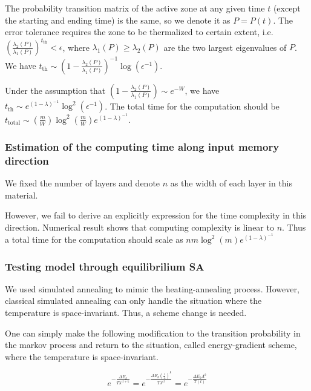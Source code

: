 \documentclass[twocolumn,superscriptaddress,english,showpacs,longbibliography]{revtex4-2}
\begin{document}
The probability transition matrix of the active zone at any given time
$t$ (except the starting and ending time) is the same, so we denote it
as $P = P(t)$. The error tolerance requires the zone to be thermalized
to certain extent,
i.e.~$\left(\frac{\lambda_2(P)}{\lambda_1(P)}\right)^{t_{\text{th}}} < \epsilon$,
where $\lambda_1(P) \geq \lambda_2(P)$ are the two largest eigenvalues
of $P$. We have
$t_{\text{th}} \sim \left(1-\frac{\lambda_2(P)}{\lambda_1(P)}\right)^{-1}\log(\epsilon^{-1})$.

Under the assumption that
$\left(1-\frac{\lambda_2(P)}{\lambda_1(P)}\right)\sim e^{-W}$, we have
$t_{\text{th}} \sim e^{(1-\lambda)^{-1}}\log^2(\epsilon^{-1})$. The
total time for the computation should be
$t_{\text{total}} \sim \left(\frac{m}{W}\right)\log^2(\frac{m}{W}) e^{(1-\lambda)^{-1}}$.

\subsubsection{Estimation of the computing time along input memory direction}\label{Estimation-of-the-computing-time-along-input-memory-direction}

We fixed the number of layers and denote $n$ as the width of each layer in this material.

However, we fail to derive an explicitly expression for the time complexity in this direction. 
Numerical result shows that computing complexity is linear to $n$. Thus a total time
for the computation should scale as $nm\log^2(m)e^{(1-\lambda)^{-1}}$ 

\subsubsection{Testing model through equilibrilium SA}\label{temperature-gradient-and-energy-gradient}

We used simulated annealing to mimic the heating-annealing process.
However, classical simulated annealing can only handle the situation
where the temperature is space-invariant. Thus, a scheme change is needed.

One can simply
make the following modification to the transition probability in the
markov process and return to the situation, called energy-gradient scheme, where the temperature is space-invariant.

\begin{equation}
e^{-\frac{\Delta E_k}{T\lambda^{ct+k}}} = e^{-\frac{\Delta E_k(\frac{1}{\lambda})^k}{T\lambda^{ct}}} = e^{-\frac{\Delta E_k \Lambda^k}{T(t)}}
\end{equation}
\end{document}
